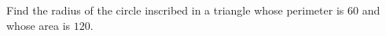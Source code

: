 Find the radius of the circle inscribed in a triangle whose perimeter is $60$ and whose area is $120$.
